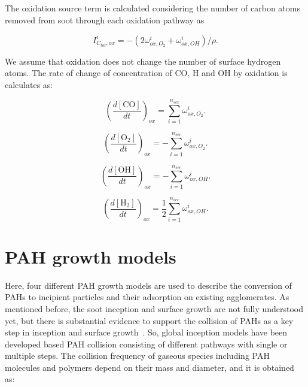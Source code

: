 The oxidation source term is calculated considering the number of carbon atoms removed from soot through each oxidation pathway as

\begin{equation}
	I^i_{C_{tot},ox} = -(2\omega^i_{ox,O_2} + \omega^i_{ox,OH})/\rho
	\label{eqn:ICtot}.
\end{equation}

We assume that oxidation does not change the number of surface hydrogen atoms. The rate of change of concentration of CO, H and OH by oxidation is calculates as:

\begin{equation}
	\left(\frac{d\left[{\mathrm{CO}}\right]}{dt}\right)_{ox} = \sum_{i=1}^{n_{sec}}\omega^i_{ox,O_2}
	\label{eqn:COrate_ox}.
\end{equation}

\begin{equation}
	\left(\frac{d\left[{\mathrm{O_2}}\right]}{dt}\right)_{ox} = -\sum_{i=1}^{n_{sec}}\omega^i_{ox,O_2}
	\label{eqn:O2rate_ox}.
\end{equation}

\begin{equation}
	\left(\frac{d\left[{\mathrm{OH}}\right]}{dt}\right)_{ox} = -\sum_{i=1}^{n_{sec}}\omega^i_{ox,OH}
	\label{eqn:Hrate_ox}.
\end{equation}

\begin{equation}
	\left(\frac{d\left[{\mathrm{H_2}}\right]}{dt}\right)_{ox} = \frac{1}{2}\sum_{i=1}^{n_{sec}}\omega^i_{ox,OH}
	\label{eqn:OHrate_ox}.
\end{equation}

\section{PAH growth models}
\label{sec:pahgrowmodel}
Here, four different PAH growth models are used to describe the conversion of PAHs to incipient particles and their adsorption on existing agglomerates. As mentioned before, the soot inception and surface growth are not fully understood yet, but there is substantial evidence to support the collision of PAHs as a key step in inception and surface growth~\citep{zhao2003measurement, abid2009quantitative, happold2009soot}. So, global inception models have been developed based PAH collision consisting of different pathways with single or multiple steps. The collision frequency of gaseous species including PAH molecules and polymers depend on their mass and diameter, and it is obtained as:

